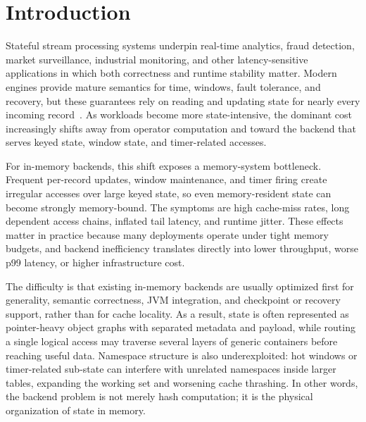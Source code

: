 \documentclass[sigconf]{acmart}
\begin{document}


\maketitle

\section{Introduction}
Stateful stream processing systems underpin real-time analytics, fraud detection, market surveillance, industrial monitoring, and other latency-sensitive applications in which both correctness and runtime stability matter. Modern engines provide mature semantics for time, windows, fault tolerance, and recovery, but these guarantees rely on reading and updating state for nearly every incoming record~\cite{akidau2013millwheel,akidau2015dataflow,murray2013naiad,carbone2017flinkstate,armbrust2018structured}. As workloads become more state-intensive, the dominant cost increasingly shifts away from operator computation and toward the backend that serves keyed state, window state, and timer-related accesses.

For in-memory backends, this shift exposes a memory-system bottleneck. Frequent per-record updates, window maintenance, and timer firing create irregular accesses over large keyed state, so even memory-resident state can become strongly memory-bound. The symptoms are high cache-miss rates, long dependent access chains, inflated tail latency, and runtime jitter. These effects matter in practice because many deployments operate under tight memory budgets, and backend inefficiency translates directly into lower throughput, worse p99 latency, or higher infrastructure cost.

The difficulty is that existing in-memory backends are usually optimized first for generality, semantic correctness, JVM integration, and checkpoint or recovery support, rather than for cache locality. As a result, state is often represented as pointer-heavy object graphs with separated metadata and payload, while routing a single logical access may traverse several layers of generic containers before reaching useful data. Namespace structure is also underexploited: hot windows or timer-related sub-state can interfere with unrelated namespaces inside larger tables, expanding the working set and worsening cache thrashing. In other words, the backend problem is not merely hash computation; it is the physical organization of state in memory.
\end{document}
